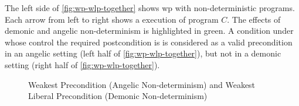 The left side of \autoref{fig:wp-wlp-together} shows wp with non-deterministic programs. 
Each arrow from left to right shows a  execution of program $C$. 
The effects of demonic and angelic non-determinism is highlighted in green. 
A condition under whose control the required postcondition is  is considered as a valid precondition in an angelic setting (left half of \autoref{fig:wp-wlp-together}), but not in a demonic setting (right half of \autoref{fig:wp-wlp-together}). 


\begin{figure}[ht!]\centering
  \hfill
\caption{Weakest Precondition (Angelic Non-determinism) and Weakest Liberal Precondition (Demonic Non-determinism)}
\label{fig:wp-wlp-together}
\end{figure}






